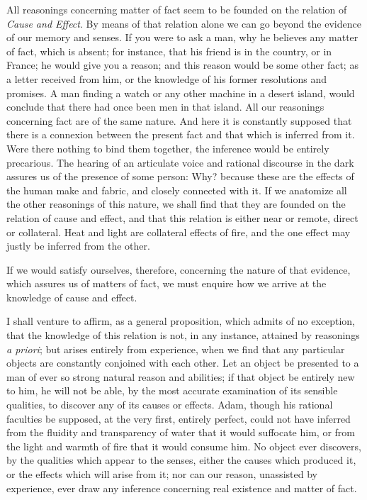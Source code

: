 \documentclass[]{article}
\begin{document}
\begin{sectionbody}
\humeparagraph  All reasonings concerning matter of fact seem to be founded on the relation of \emph{Cause and Effect}. By means of that relation alone we can go beyond the evidence of our memory and senses. If you were to ask a man, why he believes any matter of fact, which is absent; for instance, that his friend is in the country, or in France; he would give you a reason; and this reason would be some other fact; as a letter received from him, or the knowledge of his former resolutions and promises. A man finding a watch or any other machine in a desert island, would conclude that there had once been men in that island. All our reasonings concerning fact are of the same nature. And here it is constantly supposed that there is a connexion between the present fact and that which is inferred from it. Were there nothing to bind them together, the inference would be entirely precarious. The hearing of an articulate voice and rational discourse in the dark assures us of the presence of some person: Why? because these are the effects of the human make and fabric, and closely connected with it. If we anatomize all the other reasonings of this nature, we shall find that they are founded on the relation of cause and effect, and that this relation is either near or remote, direct or collateral. Heat and light are collateral effects of fire, and the one effect may justly be inferred from the other.

\humeparagraph  If we would satisfy ourselves, therefore, concerning the nature of that evidence, which assures us of matters of fact, we must enquire how we arrive at the knowledge of cause and effect.

\humeparagraph  I shall venture to affirm, as a general proposition, which admits of no exception, that the knowledge of this relation is not, in any instance, attained by reasonings \emph{a priori}; but arises entirely from experience, when we find that any particular objects are constantly conjoined with each other. Let an object be presented to a man of ever so strong natural reason and abilities; if that object be entirely new to him, he will not be able, by the most accurate examination of its sensible qualities, to discover any of its causes or effects. Adam, though his rational faculties be supposed, at the very first, entirely perfect, could not have inferred from the fluidity and transparency of water that it would suffocate him, or from the light and warmth of fire that it would consume him. No object ever discovers, by the qualities which appear to the senses, either the causes which produced it, or the effects which will arise from it; nor can our reason, unassisted by experience, ever draw any inference concerning real existence and matter of fact.


\end{sectionbody}
\end{document}
